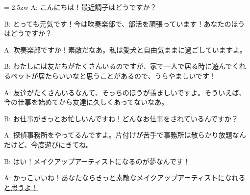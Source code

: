 \documentclass[11pt]{amsart}
\title{}
\author{}
\newenvironment{hangall}[1]{\hangindent = 2.5zw\everypar{\hangindent = 2.5zw}}{}
\begin{document}
\maketitle
\begin{hangall}{}%
A: こんにちは！最近調子はどうですか？

B: とっても元気です！今は吹奏楽部で、部活を頑張っています！あなたのほうはどうですか？

A: 吹奏楽部ですか！素敵だなあ。私は愛犬と自由気ままに過ごしていますよ。

B: わたしには友だちがたくさんいるのですが、家で一人で居る時に遊んでくれるペットが居たらいいなと思うことがあるので、うらやましいです！

A: 友達がたくさんいるなんて、そっちのほうが羨ましいですよ。そういえば、今の仕事を始めてから友達に久しくあってないなあ。

B: お仕事がきっとお忙しいんですね！どんなお仕事をされているんですか？

A: 探偵事務所をやってるんですよ。片付けが苦手で事務所は散らかり放題なんだけど、今度遊びにきてね。

B: はい！メイクアップアーティストになるのが夢なんです！

A: \ul{かっこいいね！あなたならきっと素敵なメイクアップアーティストになれると思うよ！}\end{hangall}
\end{document}
